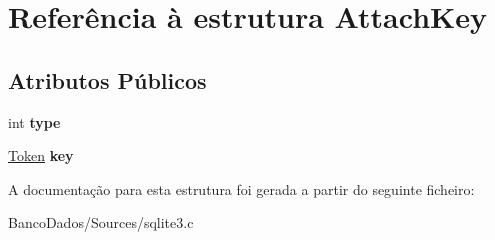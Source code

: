 \hypertarget{struct_attach_key}{\section{Referência à estrutura Attach\-Key}
\label{struct_attach_key}
}
\subsection*{Atributos Públicos}
\begin{DoxyCompactItemize}
\item 
\hypertarget{struct_attach_key_acd780bfae7415a79a90fa5ceb41515cd}{int {\bfseries type}}\label{struct_attach_key_acd780bfae7415a79a90fa5ceb41515cd}

\item 
\hypertarget{struct_attach_key_a267449f11a142a3b88c54aa01f842ad0}{\hyperlink{struct_token}{Token} {\bfseries key}}\label{struct_attach_key_a267449f11a142a3b88c54aa01f842ad0}

\end{DoxyCompactItemize}


A documentação para esta estrutura foi gerada a partir do seguinte ficheiro\-:\begin{DoxyCompactItemize}
\item 
Banco\-Dados/\-Sources/sqlite3.\-c\end{DoxyCompactItemize}
